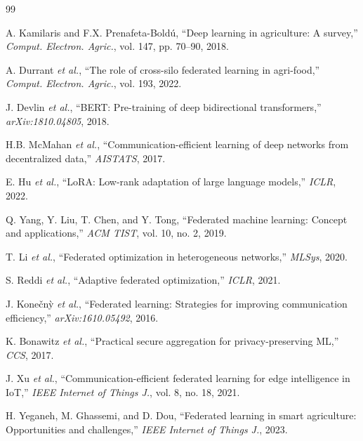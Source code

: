\documentclass[10pt,journal,compsoc]{IEEEtran}
\begin{document}
\begin{thebibliography}{99}

A. Kamilaris and F.X. Prenafeta-Bold{\'u}, ``Deep learning in agriculture: A survey,'' \textit{Comput. Electron. Agric.}, vol. 147, pp. 70--90, 2018.

A. Durrant \textit{et al.}, ``The role of cross-silo federated learning in agri-food,'' \textit{Comput. Electron. Agric.}, vol. 193, 2022.

J. Devlin \textit{et al.}, ``BERT: Pre-training of deep bidirectional transformers,'' \textit{arXiv:1810.04805}, 2018.

H.B. McMahan \textit{et al.}, ``Communication-efficient learning of deep networks from decentralized data,'' \textit{AISTATS}, 2017.

E. Hu \textit{et al.}, ``LoRA: Low-rank adaptation of large language models,'' \textit{ICLR}, 2022.

Q. Yang, Y. Liu, T. Chen, and Y. Tong, ``Federated machine learning: Concept and applications,'' \textit{ACM TIST}, vol. 10, no. 2, 2019.

T. Li \textit{et al.}, ``Federated optimization in heterogeneous networks,'' \textit{MLSys}, 2020.

S. Reddi \textit{et al.}, ``Adaptive federated optimization,'' \textit{ICLR}, 2021.

J. Kone{\v{c}}n{\`y} \textit{et al.}, ``Federated learning: Strategies for improving communication efficiency,'' \textit{arXiv:1610.05492}, 2016.

K. Bonawitz \textit{et al.}, ``Practical secure aggregation for privacy-preserving ML,'' \textit{CCS}, 2017.

J. Xu \textit{et al.}, ``Communication-efficient federated learning for edge intelligence in IoT,'' \textit{IEEE Internet of Things J.}, vol. 8, no. 18, 2021.

H. Yeganeh, M. Ghassemi, and D. Dou, ``Federated learning in smart agriculture: Opportunities and challenges,'' \textit{IEEE Internet of Things J.}, 2023.


\end{thebibliography}
\end{document}
